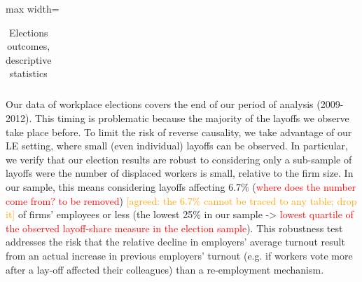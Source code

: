 \begin{table}[h]
	\caption{Elections outcomes, descriptive statistics}
	\begin{center}
		\label{tab:nego:LEnego_ele_desc}
		\begin{adjustbox}{max width=\linewidth}
\begin{tabular}{l|llllll}\toprule
			
			\bottomrule
		\end{tabular}
\end{adjustbox}
		

	\end{center}
\end{table}



Our data of workplace elections covers the end of our period of analysis (2009-2012). This timing is problematic because the majority of the layoffs we observe take place before. To limit the risk of reverse causality, we take advantage of our LE setting, where small (even individual) layoffs can be observed. In particular, we verify that our election results are robust to considering only a sub-sample of layoffs were the number of displaced workers is small, relative to the firm size. In our sample, this means considering layoffs affecting 6.7\% (\textcolor{red}{where does the number come from? to be removed}) \textcolor{orange}{[agreed: the 6.7\% cannot be traced to any table; drop it]} of firms' employees or less (the lowest 25\% in our sample -> \textcolor{red}{lowest quartile of the observed layoff-share measure in the election sample}).%
 This robustness test addresses the risk that the relative decline in employers' average turnout result from an actual increase in previous employers' turnout (e.g. if workers vote more after a lay-off affected their colleagues) than a re-employment mechanism.



